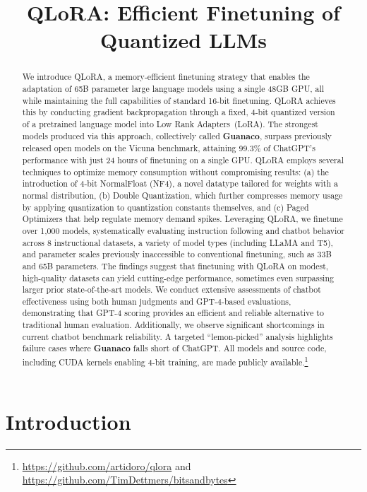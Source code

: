 \title{QLoRA: Efficient Finetuning of Quantized LLMs}

\begin{abstract}
We introduce \textsc{QLoRA}, a memory-efficient finetuning strategy that enables the adaptation of 65B parameter large language models using a single 48GB GPU, all while maintaining the full capabilities of standard 16-bit finetuning. \textsc{QLoRA} achieves this by conducting gradient backpropagation through a fixed, 4-bit quantized version of a pretrained language model into Low Rank Adapters~(LoRA). The strongest models produced via this approach, collectively called \textbf{Guanaco}, surpass previously released open models on the Vicuna benchmark, attaining 99.3\% of ChatGPT’s performance with just 24 hours of finetuning on a single GPU. \textsc{QLoRA} employs several techniques to optimize memory consumption without compromising results: (a) the introduction of 4-bit NormalFloat (NF4), a novel datatype tailored for weights with a normal distribution, (b) Double Quantization, which further compresses memory usage by applying quantization to quantization constants themselves, and (c) Paged Optimizers that help regulate memory demand spikes. Leveraging \textsc{QLoRA}, we finetune over 1,000 models, systematically evaluating instruction following and chatbot behavior across 8 instructional datasets, a variety of model types (including LLaMA and T5), and parameter scales previously inaccessible to conventional finetuning, such as 33B and 65B parameters. The findings suggest that finetuning with QLoRA on modest, high-quality datasets can yield cutting-edge performance, sometimes even surpassing larger prior state-of-the-art models. We conduct extensive assessments of chatbot effectiveness using both human judgments and GPT-4-based evaluations, demonstrating that GPT-4 scoring provides an efficient and reliable alternative to traditional human evaluation. Additionally, we observe significant shortcomings in current chatbot benchmark reliability. A targeted “lemon-picked” analysis highlights failure cases where \textbf{Guanaco} falls short of ChatGPT. All models and source code, including CUDA kernels enabling 4-bit training, are made publicly available.\footnote{\url{https://github.com/artidoro/qlora} and \url{https://github.com/TimDettmers/bitsandbytes}}
\end{abstract}

\section{Introduction}

